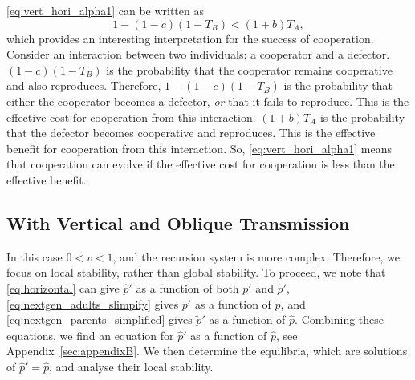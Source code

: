\documentclass[12pt]{extarticle}
\begin{document}
\autoref{eq:vert_hori_alpha1} can be written as
\begin{equation} \label{eq:vert_hori_alpha1_effective}
1 - (1-c)(1-T_B) < (1+b) T_A ,
\end{equation}
which provides an interesting interpretation for the success of cooperation. 
Consider an interaction between two individuals: a cooperator and a defector.
$(1-c)(1-T_B)$ is the probability that the cooperator remains cooperative and also reproduces. 
Therefore, $1 - (1-c)(1-T_B)$ is the probability that either the cooperator becomes a defector, \emph{or} that it fails to reproduce.
This is the effective cost for cooperation from this interaction.
$(1+b) T_A$ is the probability that the defector becomes cooperative and reproduces.
This is the effective benefit for cooperation from this interaction.
So, \autoref{eq:vert_hori_alpha1} means that cooperation can evolve if the effective cost for cooperation is less than the effective benefit.



\subsection*{With Vertical and Oblique Transmission}

In this case $0<v<1$, and the recursion system is more complex.
Therefore, we focus on local stability, rather than global stability.
To proceed, we note that 
\autoref{eq:horizontal} can give $\hat{p}'$ as a function of both $p'$ and $\tilde{p}'$,
\autoref{eq:nextgen_adults_slimpify} gives $p'$ as a function of $\tilde{p}$, and 
\autoref{eq:nextgen_parents_simplified} gives $\tilde{p}'$ as a function of $\hat{p}$. 
Combining these equations, we find an equation for $\hat{p}'$ as a function of $\hat{p}$, see Appendix~\autoref{sec:appendixB}.
We then determine the equilibria, which are solutions of $\hat{p}' = \hat{p}$, and analyse their local stability.
\end{document}
